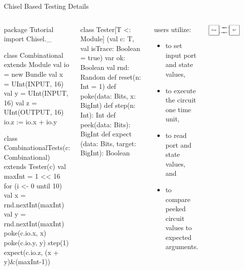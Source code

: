 \documentclass[xcolor=pdflatex,dvipsnames,table]{beamer}
\begin{document}
\begin{frame}[fragile]{Chisel Based Testing Details}

\begin{columns}
{
\begin{scala}
package Tutorial
import Chisel._

class Combinational extends Module {
  val io = new Bundle {
    val x = UInt(INPUT, 16)
    val y = UInt(INPUT, 16)
    val z = UInt(OUTPUT, 16) }
  io.z := io.x + io.y
}

class CombinationalTests(c: Combinational) 
    extends Tester(c) {
  val maxInt = 1 << 16
  for (i <- 0 until 10) {
    val x = rnd.nextInt(maxInt)
    val y = rnd.nextInt(maxInt)
    poke(c.io.x, x)
    poke(c.io.y, y)
    step(1)
    expect(c.io.z, (x + y)&(maxInt-1))
  }
}
\end{scala}
}
{
\begin{scala}
class Tester[T <: Module]
  (val c: T, val isTrace: Boolean = true) {
  var ok: Boolean
  val rnd: Random
  def reset(n: Int = 1)
  def poke(data: Bits, x: BigInt)
  def step(n: Int): Int
  def peek(data: Bits): BigInt
  def expect (data: Bits, target: BigInt): Boolean
}
\end{scala}
}
\begin{scriptsize}
users utilize:
\begin{itemize}
\item {} to set input port and state values,
\item {} to execute the circuit one time unit,
\item {} to read port and state values, and
\item {} to compare peeked circuit values to expected arguments.
\end{itemize}
\end{scriptsize}

\begin{center}
\includegraphics[width=0.8\textwidth]{../tutorial/figs/DUT.pdf}
\end{center}

\end{columns}
\end{frame}
\end{document}

